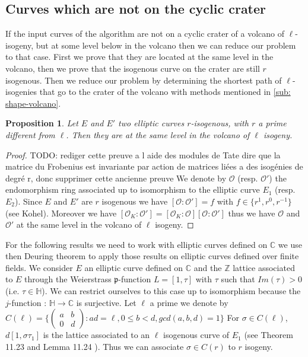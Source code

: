 \documentclass{lms}
\newcommand{\todo}[1]{{\color{red}TODO: #1}}
\newtheorem{prop}[thm]{Proposition}
\begin{document}
  \subsection{Curves which are not on the cyclic crater}

If the input curves of the algorithm are not on a cyclic crater of a volcano of $\ell$-isogeny, but at some level below in the volcano then we can reduce our problem to that case. First we prove that they are located at the same level in the volcano, then we prove that the isogenous curve on the crater are still $r$ isogenous. Then we reduce our problem by determining the shortest path of $\ell$-isogenies that go to the crater of the volcano with methods mentioned in \ref{sub: shape-volcano}.
  
\begin{prop}
Let $E$ and $E'$ two elliptic curves $r$-isogenous, with $r$ a prime different from $\ell$. Then they are at the same level in the volcano of $\ell$ isogeny.
\end{prop}

\begin{proof}\todo{rediger cette preuve a l aide des modules de Tate dire que la matrice du Frobenius est invariante par action de matrices liées a des isogénies de degré r, donc supprimer cette ancienne preuve}
We denote by $\mathcal{O}$ (resp. $\mathcal{O}'$) the endomorphism ring associated up to isomorphism to the elliptic curve $E_1$ (resp. $E_2$). Since $E$ and $E'$ are $r$ isogenous we have $[\mathcal{O}:\mathcal{O}']=f$ with $f \in \{r^1,r^0,r^{-1}\}$ (see Kohel). Moreover we have $[\mathcal{O}_K:\mathcal{O}']=[\mathcal{O}_K:\mathcal{O}][\mathcal{O}:\mathcal{O}']$ thus we have $\mathcal{O}$ and $\mathcal{O}'$ at the same level in the volcano of $\ell$ isogeny.
\end{proof}  

For the following results we need to work with elliptic curves defined on $\mathbb{C}$ we use then Deuring theorem to apply those results on elliptic curves defined over finite fields.
We consider $E$ an elliptic curve defined on $\mathbb{C}$ and the $\mathbb{Z}$ lattice associated to $E$ through the Weierstrass $\mathfrak{p}$-function $L=[1,\tau]$ with $\tau$ such that $Im(\tau)>0$(i.e. $\tau \in \mathbb{H}$). We can restrict ourselves to this case up to isomorphism because the $j$-function : $\mathbb{H} \rightarrow \mathbb{C}$ is surjective. Let $\ell$ a prime we denote by
$C(\ell)=\{\left(\begin{array}{cc}
a & b\\
0 & d
\end{array}\right): ad= \ell,0\leqslant b <d, gcd(a,b,d)=1\}$
 For $\sigma \in C(\ell)$, $d[1,\sigma \tau_1]$ is the lattice associated to an $\ell$ isogenous curve of $E_1$ (see Theorem 11.23 and Lemma 11.24 \cite{Cox89}). Thus we can associate $\sigma \in C(r)$ to $r$ isogeny.
\end{document}
